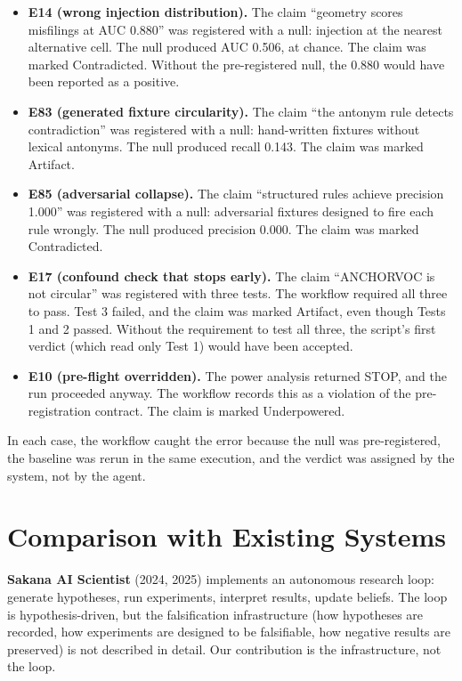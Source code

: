 \documentclass[11pt]{article}
\begin{document}
\begin{itemize}
\item \textbf{E14 (wrong injection distribution).} The claim ``geometry
scores misfilings at AUC 0.880'' was registered with a null: injection
at the nearest alternative cell. The null produced AUC 0.506, at chance.
The claim was marked Contradicted. Without the pre-registered null, the
0.880 would have been reported as a positive.

\item \textbf{E83 (generated fixture circularity).} The claim ``the
antonym rule detects contradiction'' was registered with a null:
hand-written fixtures without lexical antonyms. The null produced
recall 0.143. The claim was marked Artifact.

\item \textbf{E85 (adversarial collapse).} The claim ``structured rules
achieve precision 1.000'' was registered with a null: adversarial
fixtures designed to fire each rule wrongly. The null produced
precision 0.000. The claim was marked Contradicted.

\item \textbf{E17 (confound check that stops early).} The claim
``ANCHORVOC is not circular'' was registered with three tests. The
workflow required all three to pass. Test 3 failed, and the claim was
marked Artifact, even though Tests 1 and 2 passed. Without the
requirement to test all three, the script's first verdict (which read
only Test 1) would have been accepted.

\item \textbf{E10 (pre-flight overridden).} The power analysis returned
STOP, and the run proceeded anyway. The workflow records this as a
violation of the pre-registration contract. The claim is marked
Underpowered.
\end{itemize}

In each case, the workflow caught the error because the null was
pre-registered, the baseline was rerun in the same execution, and the
verdict was assigned by the system, not by the agent.

\section{Comparison with Existing Systems}

\textbf{Sakana AI Scientist} (2024, 2025) implements an autonomous
research loop: generate hypotheses, run experiments, interpret results,
update beliefs. The loop is hypothesis-driven, but the falsification
infrastructure (how hypotheses are recorded, how experiments are designed
to be falsifiable, how negative results are preserved) is not described
in detail. Our contribution is the infrastructure, not the loop.
\end{document}
